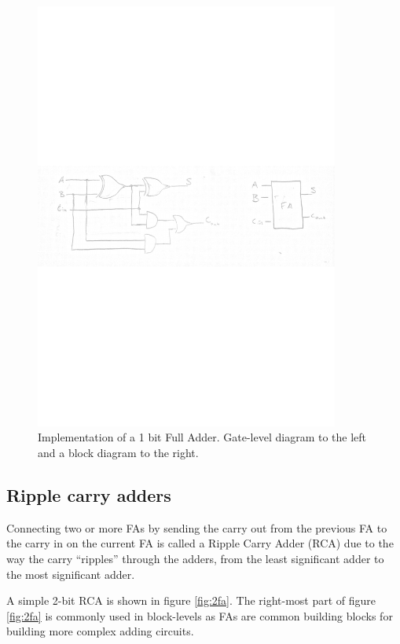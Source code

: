 \documentclass[a4paper,11pt]{report}
\begin{document}
\begin{figure}[H]
  \centering
  \includegraphics[width=10cm]{images/FA.pdf}
  \caption{Implementation of a 1 bit Full Adder. Gate-level diagram to the left and a block diagram to the right.}
  \label{fig:fa}
\end{figure}

\subsection{Ripple carry adders}

Connecting two or more FAs by sending the carry out from the previous
FA to the carry in on the current FA is called a Ripple Carry Adder
(RCA) due to the way the carry ``ripples'' through the adders, from
the least significant adder to the most significant adder.

A simple 2-bit RCA is shown in figure \ref{fig:2fa}. The right-most
part of figure \ref{fig:2fa} is commonly used in block-levels as FAs
are common building blocks for building more complex adding circuits.
\end{document}
